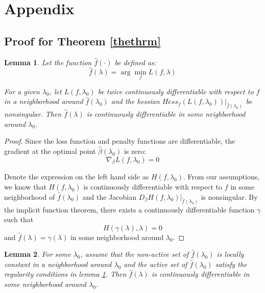 \documentclass[10pt,letterpaper]{article}
\newtheorem{lemma}{Lemma}
\begin{document}
\section*{Appendix}

\subsection{Proof for Theorem \ref{thethrm}}

\begin{lemma}
Let the function $\hat f(\cdot)$ be defined as:
\begin{equation}
\hat f(\lambda) = \arg\min_f L(f, \lambda)
\end{equation}

For a given $\lambda_0$, let $L(f, \lambda_0)$ be twice continuously differentiable with respect to $f$ in a neighborhood around $\hat f(\lambda_0)$ and the hessian $Hess_f(L(f, \lambda_0))|_{\hat f(\lambda_0)}$ be nonsingular.
Then $\hat f(\lambda)$ is continuously differentiable in some neighborhood around $\lambda_0$.
\label{differentiablethrm}
\end{lemma}

\begin{proof}
Since the loss function and penalty functions are differentiable, the gradient at the optimal point $\hat\beta(\lambda_0)$ is zero:
\begin{equation}
\nabla_{\beta} L(f, \lambda_0) = 0
\end{equation}

Denote the expression on the left hand side as $H(f, \lambda_0)$. From our assumptions, we know that $H(f, \lambda_0)$ is continuously differentiable with respect to $f$ in some neighborhood of $\hat f(\lambda_0)$ and the Jacobian $D_\beta H(f, \lambda_0) |_{\hat f(\lambda_0)}$ is nonsingular. By the implicit function theorem, there exists a continuously differentiable function $\gamma$ such that 
\begin{equation}
H(\gamma(\lambda), \lambda) = 0
\end{equation}
and
$\hat f(\lambda) = \gamma(\lambda)$ in some neighborhood around $\lambda_0$.

\end{proof}

\begin{lemma}
For some $\lambda_0$, assume that the non-active set of $\hat f(\lambda_0)$ is locally constant in a neighborhood around $\lambda_0$ and the active set of $\hat f(\lambda_0)$ satisfy the regularity conditions in lemma \ref{differentiablethrm}. Then $\hat f(\lambda)$ is continuously differentiable in some neighborhood around $\lambda_0$.
\label{activesetthrm}
\end{lemma}
\end{document}

